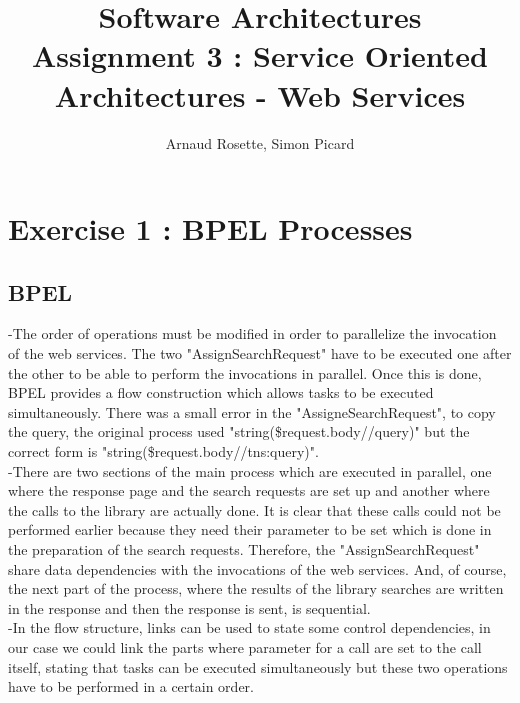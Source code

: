 \documentclass[a4paper,10pt]{article}
\title{Software Architectures\\ Assignment 3 : Service Oriented Architectures - Web Services}
\author{Arnaud Rosette, Simon Picard}
\begin{document}
\maketitle
\section{Exercise 1 : BPEL Processes}
\subsection{BPEL}
-The order of operations must be modified in order to parallelize the invocation of the web services. The two "AssignSearchRequest" have to be executed one  after the other to be able to perform the invocations in parallel. Once this is done, BPEL provides a flow construction which allows tasks to be executed simultaneously. There was a small error in the "AssigneSearchRequest", to copy the query, the original process used "string(\$request.body//query)" but the correct form is "string(\$request.body//tns:query)".\\

-There are two sections of the main process which are executed in parallel, one where the response page and the search requests are set up and another where the calls to the library are actually done. It is clear that these calls could not be performed earlier because they need their parameter to be set which is done in the preparation of the search requests. Therefore, the "AssignSearchRequest" share data dependencies with the invocations of the web services. And, of course, the next part of the process, where the results of the library searches are written in the response and then the response is sent, is sequential.\\

-In the flow structure, links can be used to state some control dependencies, in our case we could link the parts where parameter for a call are set to the call itself, stating that tasks can be executed simultaneously but these two operations have to be performed in a certain order.
\end{document}
